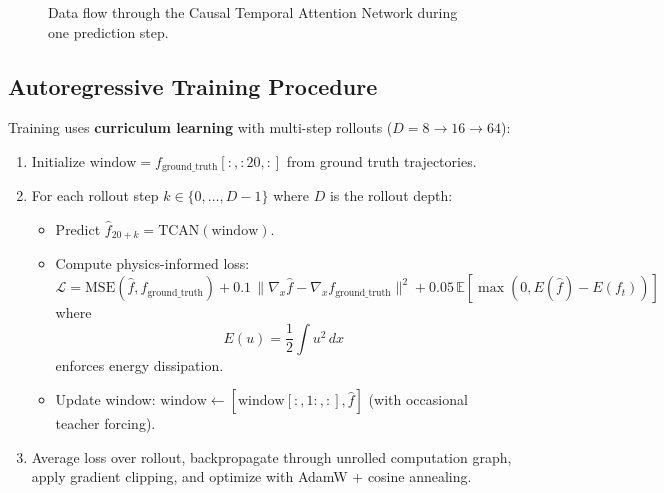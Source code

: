 \begin{figure}[h!]
{%
}
\caption{Data flow through the Causal Temporal Attention Network during one prediction step.}
\label{fig:tcn-flow}
\end{figure}

\subsection{Autoregressive Training Procedure}

Training uses \textbf{curriculum learning} with multi-step rollouts ($D=8\to16\to64$):

\begin{enumerate}
    \item Initialize $\text{window} = f_{\text{ground\_truth}}[:, :20, :]$ from ground truth trajectories.
    
    \item For each rollout step $k \in \{0, \dots, D-1\}$ where $D$ is the rollout depth:
    \begin{itemize}
        \item Predict $\hat{f}_{20+k} = \text{TCAN}(\text{window})$.
        \item Compute physics-informed loss:
        \[
        \mathcal{L}
        = \text{MSE}(\hat{f}, f_{\text{ground\_truth}})
        + 0.1 \, \|\nabla_x \hat{f} - \nabla_x f_{\text{ground\_truth}}\|^2
        + 0.05 \, \mathbb{E}\!\left[\max\!\left(0, E(\hat{f}) - E(f_t)\right)\right]
        \]
        where 
        \[
        E(u) = \frac{1}{2} \int u^2 \, dx
        \] enforces energy dissipation.
        \item Update window: $\text{window} \gets [\text{window}[:, 1:, :], \hat{f}]$ (with occasional teacher forcing).
    \end{itemize}
    
    \item Average loss over rollout, backpropagate through unrolled computation graph, apply gradient clipping, and optimize with AdamW + cosine annealing.
\end{enumerate}

